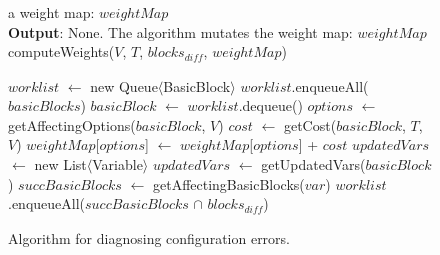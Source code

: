 \begin{figure}[t]
\quad a weight map: $\mathit{weightMap}$\\
\textbf{Output}: None. The algorithm mutates the weight map: $\mathit{weightMap}$\\
\vspace{-4mm}%
computeWeights($\mathit{V}$, $\mathit{T}$, $\mathit{blocks_{diff}}$, $\mathit{weightMap}$)\\
\begin{algorithmic}[1]
\STATE $\mathit{worklist}$ $\leftarrow$ new Queue$\langle$BasicBlock$\rangle$
\STATE $\mathit{worklist}$.enqueueAll($\mathit{basicBlocks}$)
\STATE $\mathit{basicBlock}$ $\leftarrow$ $\mathit{worklist}$.dequeue()
\STATE $\mathit{options}$ $\leftarrow$ getAffectingOptions($\mathit{basicBlock}$, $\mathit{V}$)
\STATE $\mathit{cost}$ $\leftarrow$ getCost($\mathit{basicBlock}$, $\mathit{T}$, $\mathit{V}$)
\STATE $\mathit{weightMap}$[$\mathit{options}$] $\leftarrow$ $\mathit{weightMap}$[$\mathit{options}$] + $\mathit{cost}$
\ENDFOR
\STATE $\mathit{updatedVars}$ $\leftarrow$ new List$\langle$Variable$\rangle$
\STATE $\mathit{updatedVars}$ $\leftarrow$ getUpdatedVars($\mathit{basicBlock}$)
\ENDIF
{}
\STATE $\mathit{succBasicBlocks}$ $\leftarrow$ getAffectingBasicBlocks($\mathit{var}$)
\STATE $\mathit{worklist}$.enqueueAll($\mathit{succBasicBlocks}$ $\cap$ $\mathit{blocks_{diff}}$)
\ENDIF
\ENDFOR
\ENDWHILE
\vspace{-2mm}
\end{algorithmic}
\caption{Algorithm for diagnosing configuration errors.
\label{fig:diagalg}
}
\end{figure}
